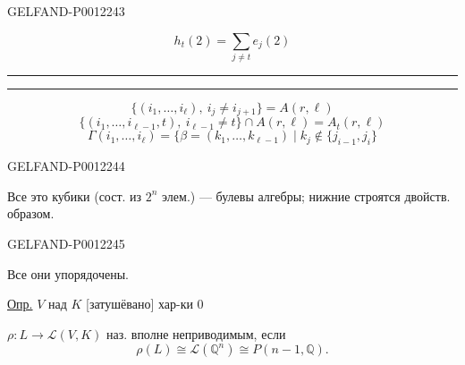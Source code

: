 \begin{GelfandAdjacentEvidence}{GELFAND-P001224}{3}

\begin{equation*}
h_t(2)=\sum_{j\ne t}e_j(2)
\end{equation*}
\begin{center}\rule{.9em}{.35pt}\quad\rule{.9em}{.35pt}\end{center}
\begin{equation*}
\{(i_1,\ldots,i_\ell),\ i_j\ne i_{j+1}\}=A(r,\ell)
\end{equation*}
\begin{equation*}
\{(i_1,\ldots,i_{\ell-1},t),\ i_{\ell-1}\ne t\}\cap A(r,\ell)=A_t(r,\ell)
\end{equation*}
\begin{equation*}
\Gamma(i_1,\ldots,i_\ell)=\{\beta=(k_1,\ldots,k_{\ell-1})\mid k_j\notin\{j_{i-1},j_i\}
\end{equation*}
\end{GelfandAdjacentEvidence}
\begin{GelfandAdjacentEvidence}{GELFAND-P001224}{4}


Все это кубики (сост. из \(2^n\) элем.) --- булевы алгебры;
нижние строятся двойств. образом.
\end{GelfandAdjacentEvidence}
\begin{GelfandAdjacentEvidence}{GELFAND-P001224}{5}


Все они упорядочены.

\underline{Опр.} \(V\) над \(K\) [затушёвано] хар-ки \(0\)
\end{GelfandAdjacentEvidence}


\(\rho:L\longrightarrow\mathcal L(V,K)\) наз. вполне неприводимым, если
\begin{equation*}
\rho(L)\cong\mathcal L(\mathbb Q^n)\cong P(n-1,\mathbb Q).
\end{equation*}


